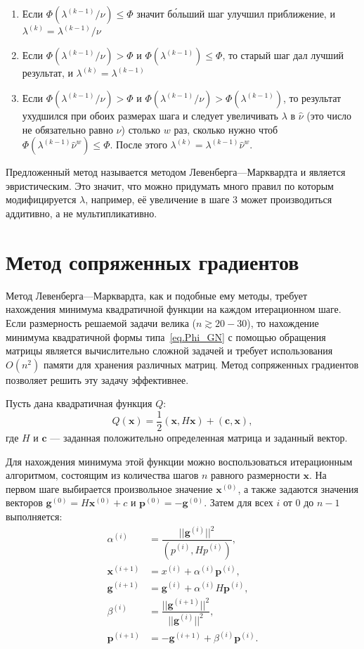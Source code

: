 \documentclass[fontsize=12pt, paper=a4]{article}
\renewcommand{\vec}[1]{\mathbf{#1}}
\def\x{\vec{x}}
\def\c{\vec{c}}
\begin{document}
\begin{enumerate}
 \item Если $\Phi(\lambda^{(k-1)} / \nu) \leq \Phi$ значит б\'{о}льший шаг улучшил приближение, и $\lambda^{(k)} = \lambda^{(k-1)} / \nu$
 \item Если $\Phi(\lambda^{(k-1)} / \nu) > \Phi$ и $\Phi(\lambda^{(k-1)}) \leq \Phi$, то старый шаг дал лучший результат, и $\lambda^{(k)} = \lambda^{(k-1)}$
 \item Если $\Phi(\lambda^{(k-1)} / \nu) > \Phi$ и $\Phi(\lambda^{(k-1)} / \nu) > \Phi(\lambda^{(k-1)})$, то результат ухудшился при обоих размерах шага и следует увеличивать $\lambda$ в $\hat\nu$ (это число не обязательно равно $\nu$) столько $w$ раз, сколько нужно чтоб $\Phi(\lambda^{(k-1)} \hat\nu^w) \leq \Phi$.
  После этого $\lambda^{(k)} = \lambda^{(k-1)} \hat\nu^w$.
\end{enumerate}

Предложенный метод называется методом Левенберга---Марквардта и является эвристическим.
Это значит, что можно придумать много правил по которым модифицируется $\lambda$, например, её увеличение в шаге 3 может производиться аддитивно, а не мультипликативно.

\section{Метод сопряженных градиентов}
Метод Левенберга---Марквардта, как и подобные ему методы, требует нахождения минимума квадратичной функции на каждом итерационном шаге.
Если размерность решаемой задачи велика ($n \gtrsim 20-30$), то нахождение минимума квадратичной формы типа~\eqref{eq.Phi_GN} с помощью обращения матрицы является вычислительно сложной задачей и требует использования $O(n^2)$ памяти для хранения различных матриц.
Метод сопряженных градиентов позволяет решить эту задачу эффективнее.

Пусть дана квадратичная функция $Q$:
\begin{equation}
Q(\x) = \dfrac12 (\x, H \x) + (\c, \x),
\end{equation}
где $H$ и $\c$ --- заданная положительно определенная матрица и заданный вектор.

Для нахождения минимума этой функции можно воспользоваться итерационным алгоритмом, состоящим из количества шагов $n$ равного размерности $\x$.
На первом шаге выбирается произвольное значение $\x^{(0)}$, а также задаются значения векторов $\vec{g}^{(0)} = H\x^{(0)} + c$ и $\vec{p}^{(0)} = - \vec{g}^{(0)}$.
Затем для всех $i$ от 0 до $n-1$ выполняется:
\begin{equation}
\begin{split}
 \alpha^{(i)} &= \dfrac{||\vec{g}^{(i)}||^2}{(p^{(i)}, H p^{(i)})},\\
 \x^{(i+1)} &= x^{(i)} + \alpha^{(i)} \vec{p}^{(i)},\\
 \vec{g}^{(i+1)} &= \vec{g}^{(i)} + \alpha^{(i)} H \vec{p}^{(i)},\\
 \beta^{(i)} &= \dfrac{||\vec{g}^{(i+1)}||^2}{||\vec{g}^{(i)}||^2},\\
 \vec{p}^{(i+1)} &= -\vec{g}^{(i+1)} + \beta^{(i)} \vec{p}^{(i)}.
\end{split}
\end{equation}
\end{document}
